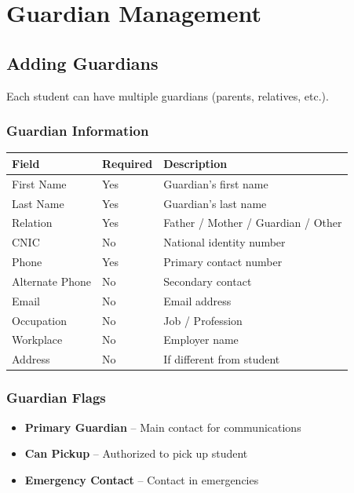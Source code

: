 \documentclass[12pt,a4paper]{report}
\begin{document}
\chapter{Guardian Management}

\section{Adding Guardians}

Each student can have multiple guardians (parents, relatives, etc.).

\subsection{Guardian Information}

\begin{longtable}{@{}p{4cm}p{3cm}p{6cm}@{}}
\toprule
\textbf{Field} & \textbf{Required} & \textbf{Description} \\
\midrule
\endhead
First Name & Yes & Guardian's first name \\
Last Name & Yes & Guardian's last name \\
Relation & Yes & Father / Mother / Guardian / Other \\
CNIC & No & National identity number \\
Phone & Yes & Primary contact number \\
Alternate Phone & No & Secondary contact \\
Email & No & Email address \\
Occupation & No & Job / Profession \\
Workplace & No & Employer name \\
Address & No & If different from student \\
\bottomrule
\end{longtable}

\subsection{Guardian Flags}

\begin{itemize}[leftmargin=*]
    \item \textbf{Primary Guardian} -- Main contact for communications
    \item \textbf{Can Pickup} -- Authorized to pick up student
    \item \textbf{Emergency Contact} -- Contact in emergencies
\end{itemize}
\end{document}
